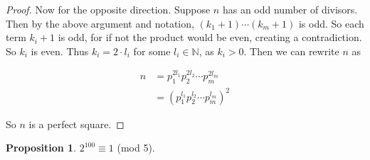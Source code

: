 \documentclass{article}
\theoremstyle{definition}
\newtheorem{proposition}{Proposition}[section]
\begin{document}
\begin{proof}
Now for the opposite direction. Suppose $n$ has an odd number of divisors. Then by the above argument and notation, $(k_1 + 1) \cdots (k_m + 1)$ is odd. So each term $k_i + 1$ is odd, for if not the product would be even, creating a contradiction. So $k_i$ is even. Thus $k_i = 2 \cdot l_i$ for some $l_i \in \mathbb{N}$, as $k_i > 0$. Then we can rewrite $n$ as

\begin{align*}
n &= p_1^{2l_1} p_2^{2l_2} \cdots p_m^{2l_m}  \\
&= \left(p_1^{l_1} p_2^{l_2} \cdots p_m^{l_m} \right)^2
\end{align*}

So $n$ is a perfect square.

\end{proof}

\begin{proposition}  \label{special-case}
$2^{100} \equiv 1$ (mod 5).
\end{proposition}
\end{document}
